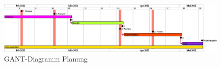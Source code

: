 \vspace*{3mm}

\begin{figure}[htp]
    \begin{center}
        \includegraphics[width=1\linewidth]{content/diagrams/out/planning/planning.png}
        \caption{GANT-Diagramm Planung}
      \end{center}
\end{figure}